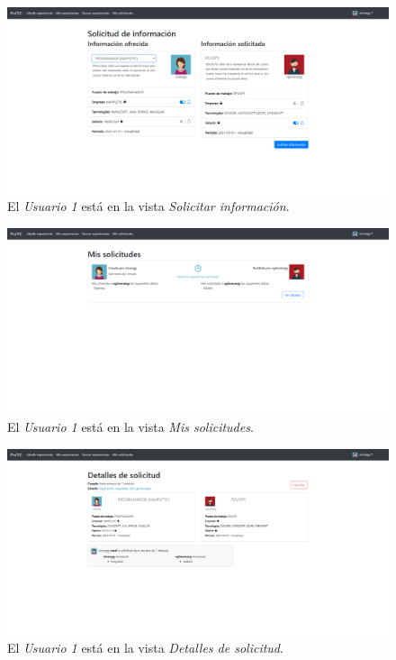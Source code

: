 \documentclass[a4paper, 12pt]{book}
\begin{document}
    \begin{figure}
        \centering
        \includegraphics[width=15cm, keepaspectratio]{img/5.2.png}
        \caption{El \emph{Usuario 1} está en la vista \emph{Solicitar información}.}
        \label{fig:use_cases_5_2}
    \end{figure}

    \begin{figure}
        \centering
        \includegraphics[width=15cm, keepaspectratio]{img/5.3.png}
        \caption{El \emph{Usuario 1} está en la vista \emph{Mis solicitudes}.}
        \label{fig:use_cases_5_3}
    \end{figure}

    \begin{figure}
        \centering
        \includegraphics[width=15cm, keepaspectratio]{img/5.4.png}
        \caption{El \emph{Usuario 1} está en la vista \emph{Detalles de solicitud}.}
        \label{fig:use_cases_5_4}
    \end{figure}
\end{document}
